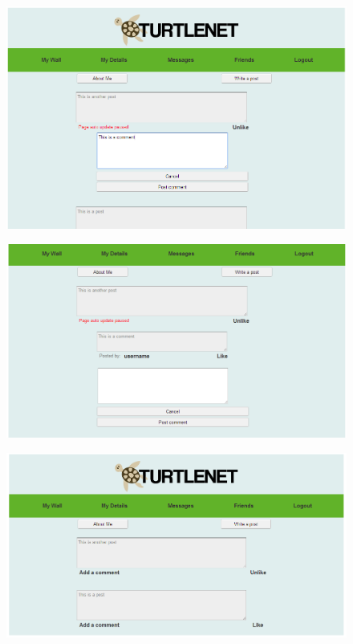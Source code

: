 \begin{figure}[h]
    \centering
    \includegraphics{images/screenshots/crop6.png}
\end{figure}

\begin{figure}[h]
    \centering
    \includegraphics{images/screenshots/crop7.png}
\end{figure}

\begin{figure}[h]
    \centering
    \includegraphics{images/screenshots/crop8.png}
\end{figure}

